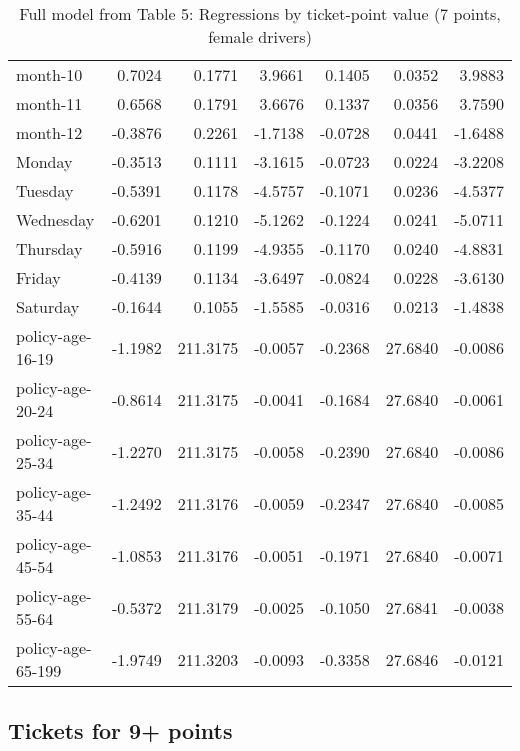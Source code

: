 \documentclass[10pt]{article}
\begin{document}
\begin{table}[ht]
\begin{tabular}{lrrrrrr}
  month-10 & 0.7024 & 0.1771 & 3.9661 & 0.1405 & 0.0352 & 3.9883 \\ 
  month-11 & 0.6568 & 0.1791 & 3.6676 & 0.1337 & 0.0356 & 3.7590 \\ 
  month-12 & -0.3876 & 0.2261 & -1.7138 & -0.0728 & 0.0441 & -1.6488 \\ 
  Monday & -0.3513 & 0.1111 & -3.1615 & -0.0723 & 0.0224 & -3.2208 \\ 
  Tuesday & -0.5391 & 0.1178 & -4.5757 & -0.1071 & 0.0236 & -4.5377 \\ 
  Wednesday & -0.6201 & 0.1210 & -5.1262 & -0.1224 & 0.0241 & -5.0711 \\ 
  Thursday & -0.5916 & 0.1199 & -4.9355 & -0.1170 & 0.0240 & -4.8831 \\ 
  Friday & -0.4139 & 0.1134 & -3.6497 & -0.0824 & 0.0228 & -3.6130 \\ 
  Saturday & -0.1644 & 0.1055 & -1.5585 & -0.0316 & 0.0213 & -1.4838 \\ 
  policy-age-16-19 & -1.1982 & 211.3175 & -0.0057 & -0.2368 & 27.6840 & -0.0086 \\ 
  policy-age-20-24 & -0.8614 & 211.3175 & -0.0041 & -0.1684 & 27.6840 & -0.0061 \\ 
  policy-age-25-34 & -1.2270 & 211.3175 & -0.0058 & -0.2390 & 27.6840 & -0.0086 \\ 
  policy-age-35-44 & -1.2492 & 211.3176 & -0.0059 & -0.2347 & 27.6840 & -0.0085 \\ 
  policy-age-45-54 & -1.0853 & 211.3176 & -0.0051 & -0.1971 & 27.6840 & -0.0071 \\ 
  policy-age-55-64 & -0.5372 & 211.3179 & -0.0025 & -0.1050 & 27.6841 & -0.0038 \\ 
  policy-age-65-199 & -1.9749 & 211.3203 & -0.0093 & -0.3358 & 27.6846 & -0.0121 \\ 
   \hline
\end{tabular}
\caption{Full model from Table 5: Regressions by ticket-point value (7 points, female drivers)} 
\label{tab_5_7_pts_F}
\end{table}


\clearpage
\pagebreak




\subsection{Tickets for 9+ points}
\end{document}
